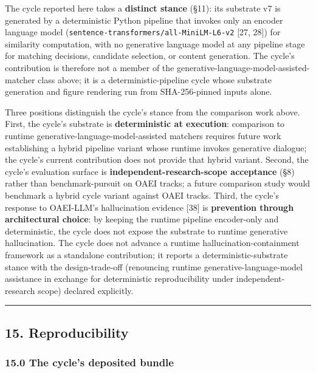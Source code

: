 \documentclass[
]{article}
\begin{document}
The cycle reported here takes a \textbf{distinct stance} (§11): its
substrate v7 is generated by a deterministic Python pipeline that
invokes only an encoder language model
(\texttt{sentence-transformers/all-MiniLM-L6-v2} {[}27, 28{]}) for
similarity computation, with no generative language model at any
pipeline stage for matching decisions, candidate selection, or content
generation. The cycle's contribution is therefore not a member of the
generative-language-model-assisted-matcher class above; it is a
deterministic-pipeline cycle whose substrate generation and figure
rendering run from SHA-256-pinned inputs alone.

Three positions distinguish the cycle's stance from the comparison work
above. First, the cycle's substrate is \textbf{deterministic at
execution}: comparison to runtime generative-language-model-assisted
matchers requires future work establishing a hybrid pipeline variant
whose runtime invokes generative dialogue; the cycle's current
contribution does not provide that hybrid variant. Second, the cycle's
evaluation surface is \textbf{independent-research-scope acceptance}
(§8) rather than benchmark-pursuit on OAEI tracks; a future comparison
study would benchmark a hybrid cycle variant against OAEI tracks. Third,
the cycle's response to OAEI-LLM's hallucination evidence {[}38{]} is
\textbf{prevention through architectural choice}: by keeping the runtime
pipeline encoder-only and deterministic, the cycle does not expose the
substrate to runtime generative hallucination. The cycle does not
advance a runtime hallucination-containment framework as a standalone
contribution; it reports a deterministic-substrate stance with the
design-trade-off (renouncing runtime generative-language-model
assistance in exchange for deterministic reproducibility under
independent-research scope) declared explicitly.

\begin{center}\rule{0.5\linewidth}{0.5pt}\end{center}

\subsection{15. Reproducibility}\label{reproducibility}

\subsubsection{15.0 The cycle's deposited
bundle}\label{the-cycles-deposited-bundle}
\end{document}
